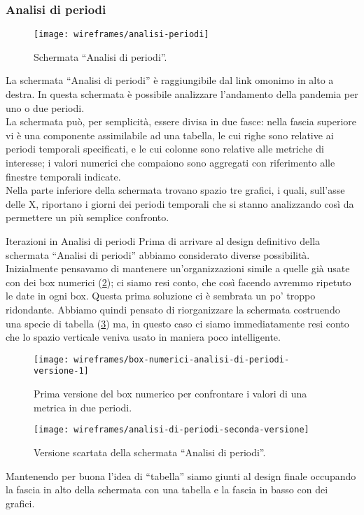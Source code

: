 \documentclass[../../../main.tex]{subfiles}
\begin{document}
\subsubsection{Analisi di periodi}\label{ss:analisi-di-periodi}
\begin{figure}[H]
    \centering
    \texttt{[image: wireframes/analisi-periodi]}
    \caption{Schermata ``Analisi di periodi''.}
    \label{fig:analisi-periodi}
\end{figure}
La schermata ``Analisi di periodi'' è raggiungibile dal link omonimo in alto a destra. In questa schermata è possibile analizzare l'andamento della pandemia per uno o due periodi.\\
La schermata può, per semplicità, essere divisa in due fasce: nella fascia superiore vi è una componente assimilabile ad una tabella, le cui righe sono relative ai periodi temporali specificati, e le cui colonne sono relative alle metriche di interesse; i valori numerici che compaiono sono aggregati con riferimento alle finestre temporali indicate.\\
Nella parte inferiore della schermata trovano spazio tre grafici, i quali, sull'asse delle X, riportano i giorni dei periodi temporali che si stanno analizzando così da permettere un più semplice confronto.
\clearpage
\begin{bclogo}{Iterazioni in Analisi di periodi}
Prima di arrivare al design definitivo della schermata ``Analisi di periodi'' abbiamo considerato diverse possibilità.\\
Inizialmente pensavamo di mantenere un'organizzazioni simile a quelle già usate con dei box numerici (\ref{fig:box-numerici-analisi-di-periodi-versione-1}); ci siamo resi conto, che così facendo avremmo ripetuto le date in ogni box. Questa prima soluzione ci è sembrata un po' troppo ridondante. Abbiamo quindi pensato di riorganizzare la schermata costruendo una specie di tabella (\ref{fig:analisi-di-periodi-seconda-versione}) ma, in questo caso ci siamo immediatamente resi conto che lo spazio verticale veniva usato in maniera poco intelligente.
\begin{figure}[H]
    \centering
    \texttt{[image: wireframes/box-numerici-analisi-di-periodi-versione-1]}
    \caption{Prima versione del box numerico per confrontare i valori di una metrica in due periodi.}\label{fig:box-numerici-analisi-di-periodi-versione-1}
\end{figure}
\begin{figure}[H]
    \centering
    \texttt{[image: wireframes/analisi-di-periodi-seconda-versione]}
    \caption{Versione scartata della schermata ``Analisi di periodi''.}
    \label{fig:analisi-di-periodi-seconda-versione}
\end{figure}

Mantenendo per buona l'idea di ``tabella'' siamo giunti al design finale occupando la fascia in alto della schermata con una tabella e la fascia in basso con dei grafici.
\end{bclogo}
\clearpage
\end{document}
